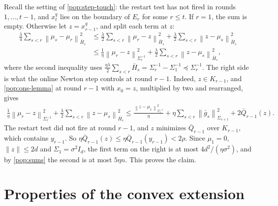 \documentclass[12pt,cleveref]{jmlr}
\renewenvironment{proof}[1][\proofname]
{\par\noindent{\bfseries\upshape #1\ }}
{\jmlrQED}
\newcommand{\1}{\mathbf 1}
\newcommand{\normm}[2]{\left\lVert #1\right\rVert_{#2}}
\begin{document}
\begin{proof}[Proof of \cref{pop:movement}]
    Recall the setting of \cref{pop:step-touch}: the restart test has not fired in rounds $1,\ldots,t-1$, and $x^q_t$ lies on the boundary of $E_r$ for some $r\leq t$. If $r=1$, the sum is empty. Otherwise let $z=x^q_{r-1}$, and split each term at $z$:
    \begin{align}
        \frac{\lambda}{4}\sum_{s<r}\normm{\mu_s-\mu_r}{\bar H_s}^2
        &\leq\frac{\lambda}{2}\sum_{s<r}\normm{\mu_r-z}{\bar H_s}^2
        +\frac{\lambda}{2}\sum_{s<r}\normm{z-\mu_s}{\bar H_s}^2\\
        &\leq\frac{1}{\eta}\normm{\mu_r-z}{\Sigma_r^{-1}}^2
        +\frac{\lambda}{2}\sum_{s<r}\normm{z-\mu_s}{\bar H_s}^2,
    \end{align}
    where the second inequality uses $\frac{\eta\lambda}{2}\sum_{s<r}\bar H_s=\Sigma_r^{-1}-\Sigma_1^{-1}\preceq\Sigma_r^{-1}$. The right side is what the online Newton step controls at round $r-1$. Indeed, $z\in K_{r-1}$, and \cref{pop:ons-lemma} at round $r-1$ with $x_0=z$, multiplied by two and rearranged, gives
    \begin{align}
        \frac{1}{\eta}\normm{\mu_r-z}{\Sigma_r^{-1}}^2
        +\frac{\lambda}{2}\sum_{s<r}\normm{z-\mu_s}{\bar H_s}^2
        \leq\frac{\normm{z-\mu_1}{\Sigma_1^{-1}}^2}{\eta}
        +\eta\sum_{s<r}\normm{\bar g_s}{\Sigma_{s+1}}^2
        +2\bar Q_{r-1}(z).
    \end{align}
    The restart test did not fire at round $r-1$, and $z$ minimizes $\bar Q_{r-1}$ over $K_{r-1}$, which contains $y_{r-1}$. So $\eta\bar Q_{r-1}(z)\leq\eta\bar Q_{r-1}(y_{r-1})<2\rho$. Since $\mu_1=0$, $\|z\|\leq2d$ and $\Sigma_1=\sigma^2I_d$, the first term on the right is at most $4d^2/(\eta\sigma^2)$, and by \cref{pop:sums} the second is at most $5\eta n$. This proves the claim.
\end{proof}

\section{Properties of the convex extension}
\label{app:extension}
\end{document}
